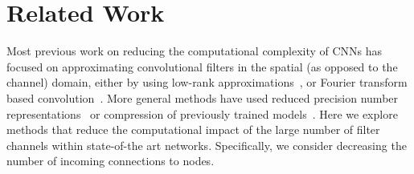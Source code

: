 \documentclass[thesis]{subfiles}
\begin{document}
	\section{Related Work}
	\label{previouswork}
	Most previous work on reducing the computational complexity of CNNs has focused on approximating convolutional filters in the spatial (as opposed to the channel) domain, either by using low-rank approximations~\citep{mamalet2012simplifying,journals/corr/JaderbergVZ14, journals/pami/SironiTRLF15, journals/corr/LebedevGROL14, Ioannou2016}, or Fourier transform based convolution~\cite{mathieu2013fast, rippel2015spectral}. More general methods have used reduced precision number representations~\cite{1502.02551v1} or compression of previously trained models~\cite{Chen2015,Kim2016}. Here we explore methods that reduce the computational impact of the large number of filter channels within state-of-the art networks. Specifically, we consider decreasing the number of incoming connections to nodes.
	
\end{document}

